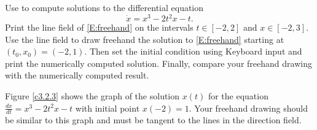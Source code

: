 \documentclass{ximera}
\begin{document}
\begin{exercise} \label{c3.2.3}
Use {\dfield} to compute solutions to the differential
equation
\begin{equation}  \label{E:freehand}
\dot{x} = x^3-2t^2x-t.
\end{equation}
Print the line field of \eqref{E:freehand} on the intervals
$t\in[-2,2]$ and $x\in[-2,3]$.  Use the line field to draw freehand
the solution to \eqref{E:freehand} starting at $(t_0,x_0)=(-2,1)$.
Then set the initial condition using {\sf Keyboard input}
and print the numerically computed solution. Finally, compare
your freehand drawing with the numerically computed result.

\begin{solution}

Figure \ref{c3.2.3} shows the graph of the solution $x(t)$ for the
equation $\frac{dx}{dt} = x^3 - 2t^2x - t$ with initial point $x(-2) = 1$.
Your freehand drawing should be similar to this graph and must be
tangent to the lines in the direction field.

\begin{figure}[htb]
                       \centerline{%
                       }
\end{figure}

\end{solution}
\end{exercise}
\end{document}
